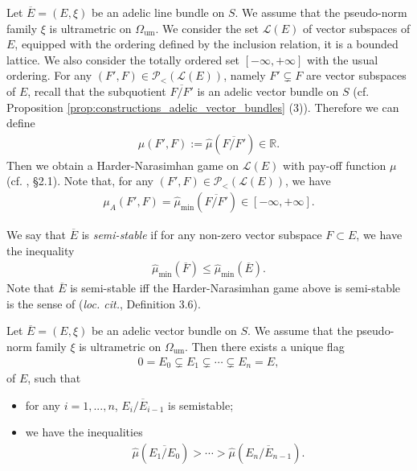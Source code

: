 \documentclass [11pt,reqno]{amsart}
\def\bR{{\mathbb{R}}}
\newcommand{\1}{\mathmybb{1}}
\def\cL{{\mathcal{L}}}
\def\cP{{\mathcal{P}}}
\def\um{\operatorname{um}}
\begin{document}
Let $\overline{E}=(E,\xi)$ be an adelic line bundle on $S$. We assume that the pseudo-norm family $\xi$ is ultrametric on $\Omega_{\um}$. We consider the set $\cL(E)$ of vector subspaces of $E$, equipped with the ordering defined by the inclusion relation, it is a bounded lattice. We also consider the totally ordered set $[-\infty,+\infty]$ with the usual ordering. For any $(F',F) \in \cP_{<}(\cL(E))$, namely $F' \subsetneq F$ are vector subspaces of $E$, recall that the subquotient $\overline{F/F'}$ is an adelic vector bundle on $S$ (cf. Proposition \ref{prop:constructions_adelic_vector_bundles} (3)). Therefore we can define
\begin{align*}
\mu(F',F) := \widehat{\mu}(\overline{F/F'}) \in \bR.
\end{align*}
Then we obtain a Harder-Narasimhan game on $\cL(E)$ with pay-off function $\mu$ (cf. \cite{ChenJeannin23}, \S 2.1). Note that, for any $(F',F) \in \cP_{<}(\cL(E))$, we have
\begin{align*}
\mu_{A}(F',F) = \widehat{\mu}_{\min}(\overline{F/F'})\in [-\infty,+\infty].
\end{align*}

\begin{definition}
\label{def:semi-stable_adelic_vector_bundle}
We say that $\overline{E}$ is \emph{semi-stable} if for any non-zero vector subspace $F \subset E$, we have the inequality
\begin{align*}
\widehat{\mu}_{\min}(\overline{F}) \leq \widehat{\mu}_{\min}(\overline{E}).
\end{align*}
Note that $\overline{E}$ is semi-stable iff the Harder-Narasimhan game above is semi-stable is the sense of (\emph{loc. cit.}, Definition 3.6).
\end{definition}

\begin{theorem}
\label{th:HN_general_proper}
Let $\overline{E}=(E,\xi)$ be an adelic vector bundle on $S$. We assume that the pseudo-norm family $\xi$ is ultrametric on $\Omega_{\um}$. Then there exists a unique flag 
\begin{align*}
0=E_0 \subsetneq E_1 \subsetneq \cdots \subsetneq E_n = E,
\end{align*}
of $E$, such that
\begin{itemize}
	\item[(1)] for any $i=1,...,n$, $\overline{E_i/E_{i-1}}$ is semistable;
	\item[(2)] we have the inequalities 
	\begin{align*}
	\widehat{\mu}(\overline{E_1/E_0}) > \cdots > \widehat{\mu}(\overline{E_n/E_{n-1}}).
	\end{align*}
\end{itemize}
\end{theorem}
\end{document}
